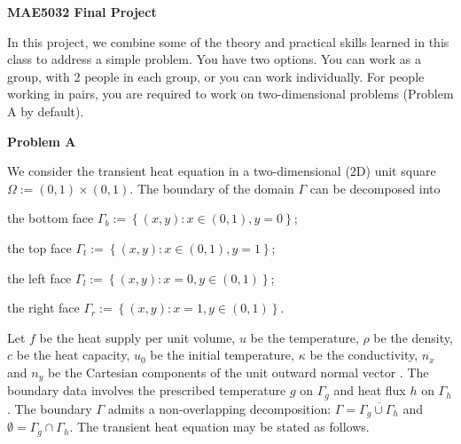 \documentclass[12pt]{article}
\begin{document}
\begin{center}
\textbf{\Large
MAE5032 Final Project
}





\end{center}

In this project, we combine some of the theory and practical skills learned in this class to address a simple problem. You have two options. You can work as a group, with 2 people in each group, or you can work individually. For people working in pairs, you are required to work on two-dimensional problems (Problem A by default).

\textbf{Problem A}

We consider the transient heat equation in a two-dimensional (2D) unit square $\Omega := (0,1)\times(0,1)$. The boundary of the domain $\Gamma$ can be decomposed into
\begin{description}
\item the bottom face $\Gamma_b := \left\lbrace (x,y) : x \in (0,1), y = 0 \right\rbrace$;
\item the top face $\Gamma_t := \left\lbrace (x,y) : x \in (0,1),  y = 1 \right\rbrace$;
\item the left face $\Gamma_l := \left\lbrace (x,y) : x=0, y \in (0,1) \right\rbrace$;
\item the right face $\Gamma_r := \left\lbrace (x,y) : x=1, y \in (0,1) \right\rbrace$.
\end{description}
Let $f$ be the heat supply per unit volume, $u$ be the temperature,  $\rho$ be the density, $c$ be the heat capacity, $u_0$ be the initial temperature, $\kappa$ be the conductivity, $n_x$ and $n_y$ be the Cartesian components of the unit outward normal vector . The boundary data involves the prescribed temperature $g$ on $\Gamma_g$ and heat flux $h$ on $\Gamma_h$. The boundary $\Gamma$ admits a non-overlapping decomposition: $\Gamma = \overline{\Gamma_{g} \cup \Gamma_h}$ and $\emptyset = \Gamma_g \cap \Gamma_h$. The transient heat equation may be stated as follows.
\end{document}
